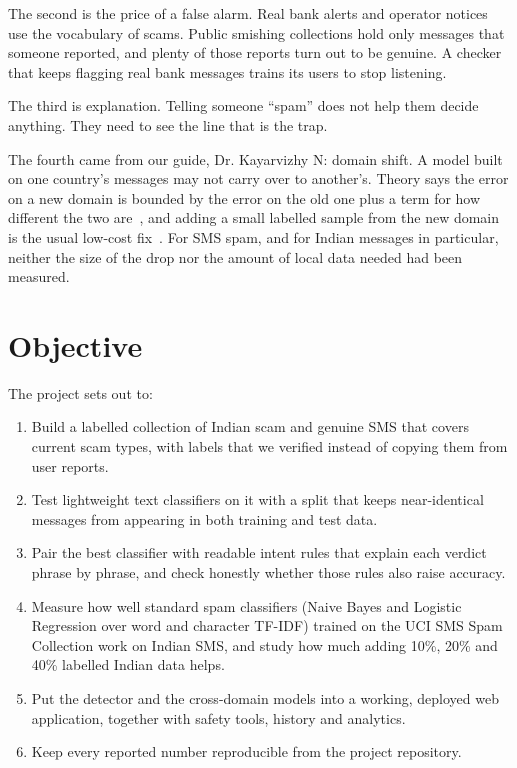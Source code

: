 The second is the price of a false alarm. Real bank alerts and operator notices use the vocabulary of scams. Public smishing collections hold only messages that someone reported, and plenty of those reports turn out to be genuine. A checker that keeps flagging real bank messages trains its users to stop listening.

The third is explanation. Telling someone ``spam'' does not help them decide anything. They need to see the line that is the trap.

The fourth came from our guide, Dr. Kayarvizhy N: domain shift. A model built on one country's messages may not carry over to another's. Theory says the error on a new domain is bounded by the error on the old one plus a term for how different the two are~\cite{bendavid2010theory}, and adding a small labelled sample from the new domain is the usual low-cost fix~\cite{pan2010survey,daume2007frustratingly}. For SMS spam, and for Indian messages in particular, neither the size of the drop nor the amount of local data needed had been measured.

\section{Objective}
The project sets out to:
\begin{enumerate}
\item Build a labelled collection of Indian scam and genuine SMS that covers current scam types, with labels that we verified instead of copying them from user reports.
\item Test lightweight text classifiers on it with a split that keeps near-identical messages from appearing in both training and test data.
\item Pair the best classifier with readable intent rules that explain each verdict phrase by phrase, and check honestly whether those rules also raise accuracy.
\item Measure how well standard spam classifiers (Naive Bayes and Logistic Regression over word and character TF-IDF) trained on the UCI SMS Spam Collection work on Indian SMS, and study how much adding 10\%, 20\% and 40\% labelled Indian data helps.
\item Put the detector and the cross-domain models into a working, deployed web application, together with safety tools, history and analytics.
\item Keep every reported number reproducible from the project repository.
\end{enumerate}

